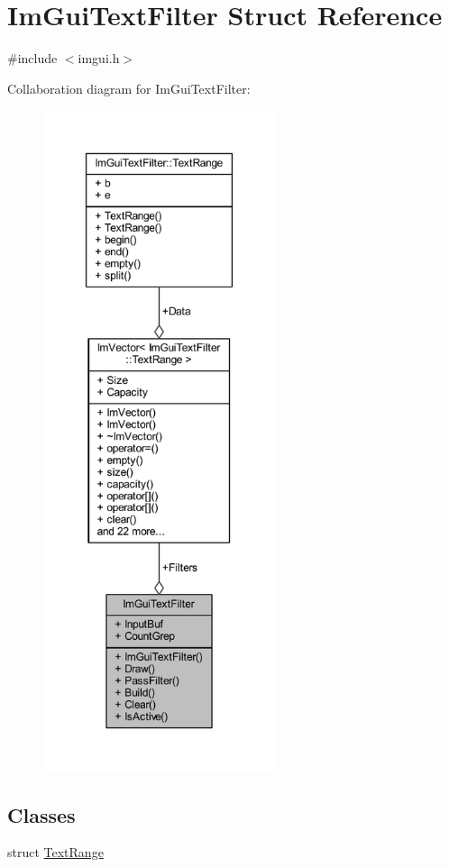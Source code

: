\hypertarget{struct_im_gui_text_filter}{}\section{Im\+Gui\+Text\+Filter Struct Reference}
\label{struct_im_gui_text_filter}


{\ttfamily \#include $<$imgui.\+h$>$}



Collaboration diagram for Im\+Gui\+Text\+Filter\+:
\nopagebreak
\begin{figure}[H]
\begin{center}
\leavevmode
\includegraphics[height=550pt]{struct_im_gui_text_filter__coll__graph}
\end{center}
\end{figure}
\subsection*{Classes}
\begin{DoxyCompactItemize}
\item 
struct \mbox{\hyperlink{struct_im_gui_text_filter_1_1_text_range}{Text\+Range}}
\end{DoxyCompactItemize}
